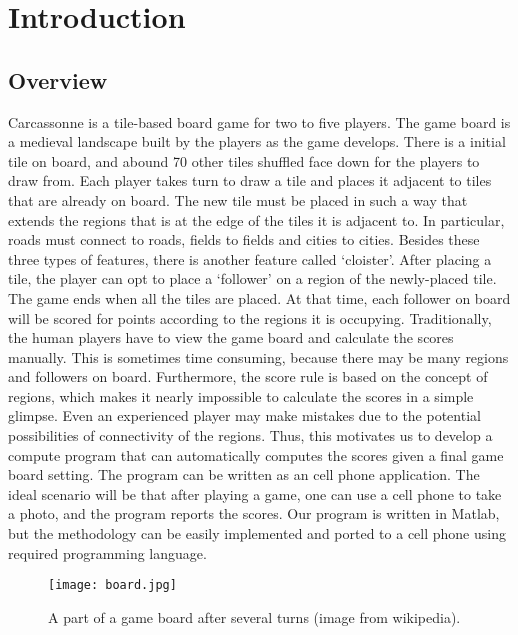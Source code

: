 \section{Introduction}
\subsection{Overview}
Carcassonne is a tile-based board game for two to five players.  The game board
is a medieval landscape built by the players as the game develops. There is a
initial tile on board, and abound 70 other tiles shuffled face down for the
players to draw from.  Each player takes turn to draw a tile and places it
adjacent to tiles that are already on board. The new tile must be placed in
such a way that extends the regions that is at the edge of the tiles it is
adjacent to.  In particular, roads must connect to roads, fields to fields and
cities to cities.  Besides these three types of features, there is another
feature called `cloister'.  After placing a tile, the player can opt to place a
`follower' on a region of the newly-placed tile. The game ends when all the
tiles are placed.  At that time, each follower on board will be scored for
points according to the regions it is occupying.  Traditionally, the human
players have to view the game board and calculate the scores manually. This is
sometimes time consuming, because there may be many regions and followers on
board.  Furthermore, the score rule is based on the concept of regions, which
makes it nearly impossible to calculate the scores in a simple glimpse.  Even
an experienced player may make mistakes due to the potential possibilities of
connectivity of the regions.  Thus, this motivates us to develop a compute
program that can automatically computes the scores given a final game board
setting.  The program can be written as an cell phone application.  The ideal
scenario will be that after playing a game, one can use a cell phone to take a
photo, and the program reports the scores.  Our program is written in Matlab,
but the methodology can be easily implemented and ported to a cell phone using
required programming language.

\begin{figure}[b]
\centering
\texttt{[image: board.jpg]}
\caption{A part of a game board after several turns (image from
wikipedia).}
\label{fig:board}
\end{figure}

